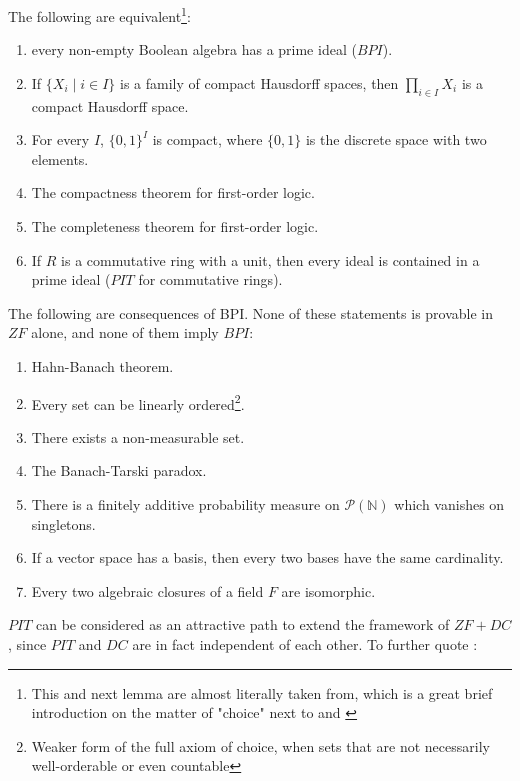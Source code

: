 \begin{lemma}\label{lemma_eq_bpi}
  The following are equivalent\footnote{This and next lemma are almost literally taken from\cite{karagila2020zornian}, which is a great brief introduction on the matter of "choice" next to \cite{herrlich2006ac} and \cite{Jech1973AboutTA}}:
  \begin{enumerate}
      \item every non-empty Boolean algebra has a prime ideal ($BPI$).
      \item If $\{X_i \mid i \in I\}$ is a family of compact Hausdorff spaces, then $\prod_{i\in I} X_i$ is a compact Hausdorff space.
      \item For every $I$, $\{0, 1\}^I$ is compact, where $\{0, 1\}$ is the discrete space with two elements.
      \item The compactness theorem for first-order logic.
      \item The completeness theorem for first-order logic.
      \item If $R$ is a commutative ring with a unit, then every ideal is contained in a prime ideal ($PIT$ for commutative rings).
  \end{enumerate}
\end{lemma}

\begin{lemma}
  The following are consequences of BPI. None of these statements is provable in $ZF$ alone, and none of them imply $BPI$:
\begin{enumerate}
    \item Hahn-Banach theorem.
    \item Every set can be linearly ordered\footnote{Weaker form of the full axiom of choice, when sets that are not necessarily well-orderable or even countable}.
    \item There exists a non-measurable set.
    \item The Banach-Tarski paradox.
    \item There is a finitely additive probability measure on $\mathcal{P}(\mathbb{N})$ which vanishes on singletons.
    \item If a vector space has a basis, then every two bases have the same cardinality.
    \item Every two algebraic closures of a field $F$ are isomorphic.
\end{enumerate}
\end{lemma}

$PIT$ can be considered as an attractive path to extend the framework of $ZF+DC$, since $PIT$ and $DC$ are in fact independent of each other. To further quote \cite{karagila2020zornian}:

